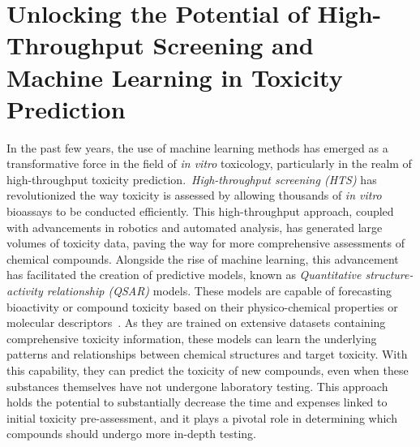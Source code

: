 \section{Unlocking the Potential of High-Throughput Screening and Machine Learning in Toxicity Prediction}

In the past few years, the use of machine learning methods has emerged as a transformative force in the field of \emph{in vitro} toxicology, particularly in the realm of high-throughput toxicity prediction.~\emph{High-throughput screening (HTS)} has revolutionized the way toxicity is assessed by allowing thousands of \emph{in vitro} bioassays to be conducted efficiently. This high-throughput approach, coupled with advancements in robotics and automated analysis, has generated large volumes of toxicity data, paving the way for more comprehensive assessments of chemical compounds.
Alongside the rise of machine learning, this advancement has facilitated the creation of predictive models, known as \emph{Quantitative structure-activity relationship (QSAR)} models. These models are capable of forecasting bioactivity or compound toxicity based on their physico-chemical properties or molecular descriptors~\cite{banerjee2018}. As they are trained on extensive datasets containing comprehensive toxicity information, these models can learn the underlying patterns and relationships between chemical structures and target toxicity. With this capability, they can predict the toxicity of new compounds, even when these substances themselves have not undergone laboratory testing. This approach holds the potential to substantially decrease the time and expenses linked to initial toxicity pre-assessment, and it plays a pivotal role in determining which compounds should undergo more in-depth testing.

